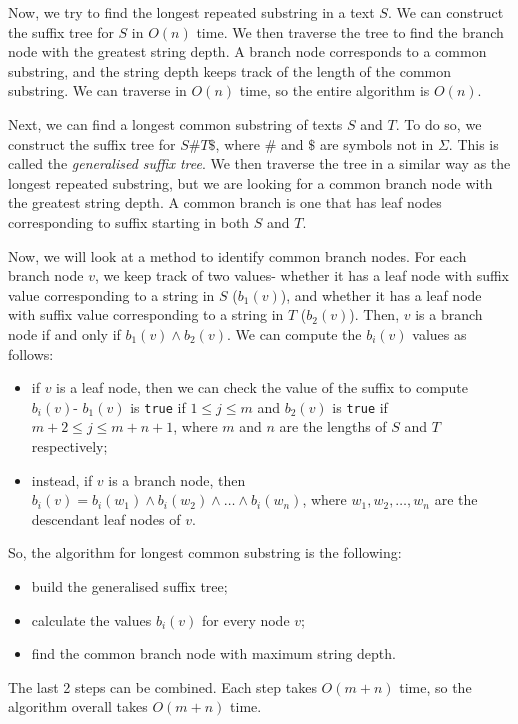 \documentclass[a4paper, openany]{memoir}
\begin{document}
    Now, we try to find the longest repeated substring in a text $S$. We can construct the suffix tree for $S$ in $O(n)$ time. We then traverse the tree to find the branch node with the greatest string depth. A branch node corresponds to a common substring, and the string depth keeps track of the length of the common substring. We can traverse in $O(n)$ time, so the entire algorithm is $O(n)$.

    Next, we can find a longest common substring of texts $S$ and $T$. To do so, we construct the suffix tree for $S\#T\$$, where $\#$ and $\$$ are symbols not in $\Sigma$. This is called the \emph{generalised suffix tree}. We then traverse the tree in a similar way as the longest repeated substring, but we are looking for a common branch node with the greatest string depth. A common branch is one that has leaf nodes corresponding to suffix starting in both $S$ and $T$.

    Now, we will look at a method to identify common branch nodes. For each branch node $v$, we keep track of two values- whether it has a leaf node with suffix value corresponding to a string in $S$ ($b_1(v)$), and whether it has a leaf node with suffix value corresponding to a string in $T$ ($b_2(v)$). Then, $v$ is a branch node if and only if $b_1(v) \land b_2(v)$. We can compute the $b_i(v)$ values as follows:
    \begin{itemize}
        \item if $v$ is a leaf node, then we can check the value of the suffix to compute $b_i(v)$- $b_1(v)$ is \texttt{true} if $1 \leq j \leq m$ and $b_2(v)$ is \texttt{true} if $m+2 \leq j \leq m+n+1$, where $m$ and $n$ are the lengths of $S$ and $T$ respectively;
        \item instead, if $v$ is a branch node, then $b_i(v) = b_i(w_1) \land b_i(w_2) \land \dots \land b_i(w_n)$, where $w_1, w_2, \dots, w_n$ are the descendant leaf nodes of $v$. 
    \end{itemize}

    So, the algorithm for longest common substring is the following:
    \begin{itemize}
        \item build the generalised suffix tree;
        \item calculate the values $b_i(v)$ for every node $v$;
        \item find the common branch node with maximum string depth.
    \end{itemize}
    The last 2 steps can be combined. Each step takes $O(m+n)$ time, so the algorithm overall takes $O(m+n)$ time.
\end{document}
